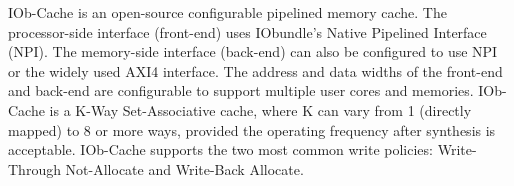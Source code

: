 IOb-Cache is an open-source configurable pipelined memory cache. The
processor-side interface (front-end) uses IObundle's Native Pipelined Interface
(NPI). The memory-side interface (back-end) can also be configured to use NPI or
the widely used AXI4 interface. The address and data widths of the front-end and
back-end are configurable to support multiple user cores and memories. IOb-Cache
is a K-Way Set-Associative cache, where K can vary from 1 (directly mapped) to 8
or more ways, provided the operating frequency after synthesis is
acceptable. IOb-Cache supports the two most common write policies: Write-Through
Not-Allocate and Write-Back Allocate.
